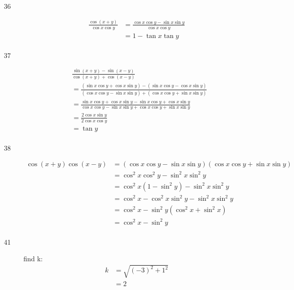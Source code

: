 \documentclass{exam}
\begin{document}
\begin{description}
      \item[36] 
        \begin{align*}
          \frac{\cos(x + y)}{\cos x \cos y} & = \frac{\cos x \cos y - \sin x \sin y}{\cos x \cos y} \\
                                            & = 1 - \tan x \tan y \\
        \end{align*}

      \item[37] 
        \begin{align*}
          & \frac{\sin(x + y) - \sin(x - y)}{\cos(x + y) + \cos(x - y)} \\
          & = \frac{(\sin x \cos y + \cos x \sin y) - (\sin x \cos y - \cos x \sin y)}{(\cos x \cos y - \sin x \sin y) + (\cos x \cos y + \sin x \sin y)} \\
          & = \frac{\sin x \cos y + \cos x \sin y - \sin x \cos y + \cos x \sin y}{\cos x \cos y - \sin x \sin y + \cos x \cos y + \sin x \sin y} \\
          & = \frac{2 \cos x \sin y}{2 \cos x \cos y} \\
          & = \tan y \\
        \end{align*}

      \item[38] 
        \begin{align*}
          \cos(x + y) \cos(x - y) & = ( \cos x \cos y - \sin x \sin y )( \cos x \cos y + \sin x \sin y ) \\
                                  & = \cos^2 x \cos^2 y - \sin^2 x \sin^2 y \\
                                  & = \cos^2 x \left( 1 - \sin^2 y \right) - \sin^2 x \sin^2 y \\
                                  & = \cos^2 x - \cos^2 x \sin^2 y  - \sin^2 x \sin^2 y \\
                                  & = \cos^2 x - \sin^2 y \left( \cos^2 x + \sin^2 x \right) \\
                                  & = \cos^2 x - \sin^2 y \\
        \end{align*}

      \item[41] 
        find k:
        \begin{align*}
          k & = \sqrt{(-3)^2 + 1^2} \\
            & = 2 \\
        \end{align*}


\end{description}
\end{document}
